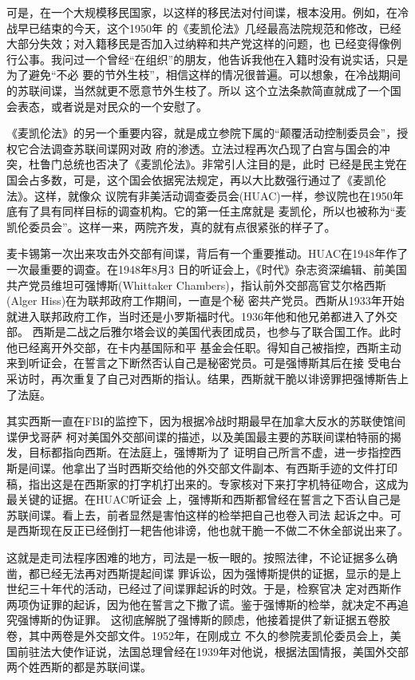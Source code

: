 \documentclass[10pt]{article}
\begin{document}
{可是，在一个大规模移民国家，以这样的移民法对付间谍，根本没用。例如，在冷战早已结束的今天，这个1950年
的《麦凯伦法》几经最高法院规范和修改，已经大部分失效；对入籍移民是否加入过纳粹和共产党这样的问题，也
已经变得像例行公事。我问过一个曾经``在组织''的朋友，他告诉我他在入籍时没有说实话，只是为了避免``不必
要的节外生枝''，相信这样的情况很普遍。可以想象，在冷战期间的苏联间谍，当然就更不愿意节外生枝了。所以
这个立法条款简直就成了一个国会表态，或者说是对民众的一个安慰了。

《麦凯伦法》的另一个重要内容，就是成立参院下属的``颠覆活动控制委员会''，授权它合法调查苏联间谍网对政
府的渗透。立法过程再次凸现了白宫与国会的冲突，杜鲁门总统也否决了《麦凯伦法》。非常引人注目的是，此时
已经是民主党在国会占多数，可是，这个国会依据宪法规定，再以大比数强行通过了《麦凯伦法》。这样，就像众
议院有非美活动调查委员会(HUAC)一样，参议院也在1950年底有了具有同样目标的调查机构。它的第一任主席就是
麦凯伦，所以也被称为``麦凯伦委员会''。这样一来，两院齐发，真的就有点很紧张的样子了。

麦卡锡第一次出来攻击外交部有间谍，背后有一个重要推动。HUAC在1948年作了一次最重要的调查。在1948年8月3
日的听证会上，《时代》杂志资深编辑、前美国共产党员维坦可\textperiodcentered 强博斯(Whittaker
Chambers)，指认前外交部高官艾尔格\textperiodcentered 西斯(Alger Hiss)在为联邦政府工作期间，一直是个秘
密共产党员。西斯从1933年开始就进入联邦政府工作，当时还是小罗斯福时代。1936年他和他兄弟都进入了外交部。
西斯是二战之后雅尔塔会议的美国代表团成员，也参与了联合国工作。此时他已经离开外交部，在卡内基国际和平
基金会任职。得知自己被指控，西斯主动来到听证会，在誓言之下断然否认自己是秘密党员。可是强博斯其后在接
受电台采访时，再次重复了自己对西斯的指认。结果，西斯就干脆以诽谤罪把强博斯告上了法庭。

其实西斯一直在FBI的监控下，因为根据冷战时期最早在加拿大反水的苏联使馆间谍伊戈\textperiodcentered 哥萨
柯对美国外交部间谍的描述，以及美国最主要的苏联间谍柏特丽的揭发，目标都指向西斯。在法庭上，强博斯为了
证明自己所言不虚，进一步指控西斯是间谍。他拿出了当时西斯交给他的外交部文件副本、有西斯手迹的文件打印
稿，指出这是在西斯家的打字机打出来的。专家核对下来打字机特征吻合，这成为最关键的证据。在HUAC听证会
上，强博斯和西斯都曾经在誓言之下否认自己是苏联间谍。看上去，前者显然是害怕这样的检举把自己也卷入司法
起诉之中。可是西斯现在反正已经倒打一耙告他诽谤，他也就干脆一不做二不休全部说出来了。

这就是走司法程序困难的地方，司法是一板一眼的。按照法律，不论证据多么确凿，都已经无法再对西斯提起间谍
罪诉讼，因为强博斯提供的证据，显示的是上世纪三十年代的活动，已经过了间谍罪起诉的时效。于是，检察官决
定对西斯作两项伪证罪的起诉，因为他在誓言之下撒了谎。鉴于强博斯的检举，就决定不再追究强博斯的伪证罪。
这彻底解脱了强博斯的顾虑，他接着提供了新证据\myrule 五卷胶卷，其中两卷是外交部文件。1952年，在刚成立
不久的参院麦凯伦委员会上，美国前驻法大使作证说，法国总理曾经在1939年对他说，根据法国情报，美国外交部
两个姓西斯的都是苏联间谍。

}
\end{document}

